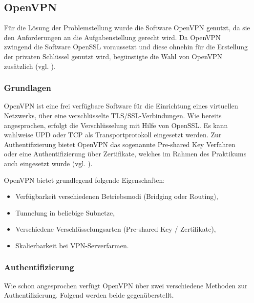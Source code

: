 \documentclass[
a4paper,     %
 headsepline, %
footsepline, %
titlepage,   %
 halfparskip,     %
 fleqn,       %
12pt         %
]{scrartcl}  %
\begin{document}
\subsection{OpenVPN}\label{openvpn}

Für die Lösung der Problemstellung wurde die Software OpenVPN genutzt, da sie den Anforderungen an die Aufgabenstellung gerecht wird. Da OpenVPN zwingend die Software OpenSSL voraussetzt und diese ohnehin für die Erstellung der privaten Schlüssel genutzt wird, begünstigte die Wahl von OpenVPN zusätzlich (vgl. \cite{openV-1}). 

\subsubsection{Grundlagen}
OpenVPN ist eine frei verfügbare Software für die Einrichtung eines virtuellen Netzwerks, über eine verschlüsselte TLS/SSL-Verbindungen. Wie bereits angesprochen, erfolgt die Verschlüsselung mit Hilfe von OpenSSL. Es kann wahlweise UPD oder TCP als Transportprotokoll eingesetzt werden. Zur Authentifizierung bietet OpenVPN das sogenannte Pre-shared Key Verfahren oder eine Authentifizierung über Zertifikate, welches im Rahmen des Praktikums auch eingesetzt wurde (vgl. \cite{openV-1}). 

OpenVPN bietet grundlegend folgende Eigenschaften:

\begin{itemize}
\item Verfügbarkeit verschiedenen Betriebsmodi (Bridging oder Routing),
\item Tunnelung in beliebige Subnetze, 
\item Verschiedene Verschlüsselungsarten (Pre-shared Key / Zertifikate),
\item Skalierbarkeit bei VPN-Serverfarmen.
\end{itemize}

\subsubsection{Authentifizierung}
Wie schon angesprochen verfügt OpenVPN über zwei verschiedene Methoden zur Authentifizierung. Folgend werden beide gegenüberstellt. 
\end{document}
